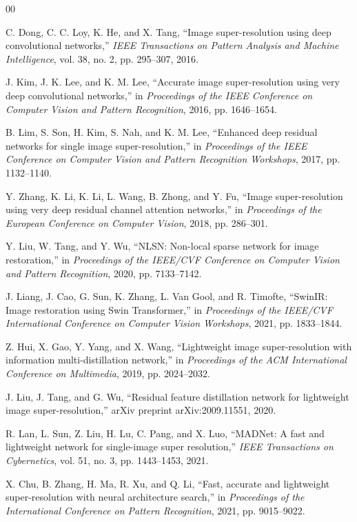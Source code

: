 \documentclass[conference]{IEEEtran}
\begin{document}
\begin{thebibliography}{00}

C. Dong, C. C. Loy, K. He, and X. Tang, ``Image super-resolution using deep convolutional networks,'' \emph{IEEE Transactions on Pattern Analysis and Machine Intelligence}, vol. 38, no. 2, pp. 295--307, 2016.

J. Kim, J. K. Lee, and K. M. Lee, ``Accurate image super-resolution using very deep convolutional networks,'' in \emph{Proceedings of the IEEE Conference on Computer Vision and Pattern Recognition}, 2016, pp. 1646--1654.

B. Lim, S. Son, H. Kim, S. Nah, and K. M. Lee, ``Enhanced deep residual networks for single image super-resolution,'' in \emph{Proceedings of the IEEE Conference on Computer Vision and Pattern Recognition Workshops}, 2017, pp. 1132--1140.

Y. Zhang, K. Li, K. Li, L. Wang, B. Zhong, and Y. Fu, ``Image super-resolution using very deep residual channel attention networks,'' in \emph{Proceedings of the European Conference on Computer Vision}, 2018, pp. 286--301.

Y. Liu, W. Tang, and Y. Wu, ``NLSN: Non-local sparse network for image restoration,'' in \emph{Proceedings of the IEEE/CVF Conference on Computer Vision and Pattern Recognition}, 2020, pp. 7133--7142.

J. Liang, J. Cao, G. Sun, K. Zhang, L. Van Gool, and R. Timofte, ``SwinIR: Image restoration using Swin Transformer,'' in \emph{Proceedings of the IEEE/CVF International Conference on Computer Vision Workshops}, 2021, pp. 1833--1844.

Z. Hui, X. Gao, Y. Yang, and X. Wang, ``Lightweight image super-resolution with information multi-distillation network,'' in \emph{Proceedings of the ACM International Conference on Multimedia}, 2019, pp. 2024--2032.

J. Liu, J. Tang, and G. Wu, ``Residual feature distillation network for lightweight image super-resolution,'' arXiv preprint arXiv:2009.11551, 2020.

R. Lan, L. Sun, Z. Liu, H. Lu, C. Pang, and X. Luo, ``MADNet: A fast and lightweight network for single-image super resolution,'' \emph{IEEE Transactions on Cybernetics}, vol. 51, no. 3, pp. 1443--1453, 2021.

X. Chu, B. Zhang, H. Ma, R. Xu, and Q. Li, ``Fast, accurate and lightweight super-resolution with neural architecture search,'' in \emph{Proceedings of the International Conference on Pattern Recognition}, 2021, pp. 9015--9022.


\end{thebibliography}
\end{document}
